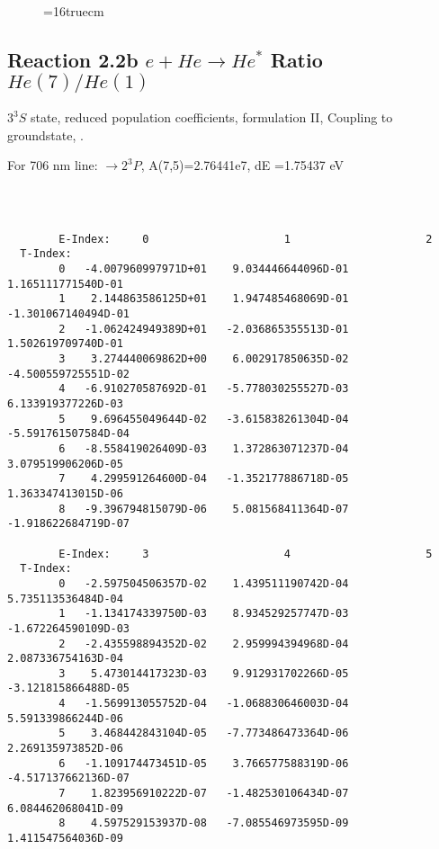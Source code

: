 \documentclass[12pt,dvipdfmx]{article}
\begin{document}
{\begin{small}
\begin{verbatim}
\end{verbatim}\end{small}
\begin{figure} \label{2.2a}
\epsfxsize=16truecm
\end{figure}
\newpage


\subsection{
  Reaction 2.2b $e + He \rightarrow He^*  $ Ratio $He(7)/He(1)$
}

  $3^3S$ state,
  reduced population coefficients, formulation II,
  Coupling to groundstate, \cite{kn:Fujimoto}.

  For 706 nm line: $\rightarrow 2^3P$, A(7,5)=2.76441e7, dE =1.75437 eV

\begin{small}\begin{verbatim}



        E-Index:     0                     1                     2
  T-Index:
        0   -4.007960997971D+01    9.034446644096D-01    1.165111771540D-01
        1    2.144863586125D+01    1.947485468069D-01   -1.301067140494D-01
        2   -1.062424949389D+01   -2.036865355513D-01    1.502619709740D-01
        3    3.274440069862D+00    6.002917850635D-02   -4.500559725551D-02
        4   -6.910270587692D-01   -5.778030255527D-03    6.133919377226D-03
        5    9.696455049644D-02   -3.615838261304D-04   -5.591761507584D-04
        6   -8.558419026409D-03    1.372863071237D-04    3.079519906206D-05
        7    4.299591264600D-04   -1.352177886718D-05    1.363347413015D-06
        8   -9.396794815079D-06    5.081568411364D-07   -1.918622684719D-07

        E-Index:     3                     4                     5
  T-Index:
        0   -2.597504506357D-02    1.439511190742D-04    5.735113536484D-04
        1   -1.134174339750D-03    8.934529257747D-03   -1.672264590109D-03
        2   -2.435598894352D-02    2.959994394968D-04    2.087336754163D-04
        3    5.473014417323D-03    9.912931702266D-05   -3.121815866488D-05
        4   -1.569913055752D-04   -1.068830646003D-04    5.591339866244D-06
        5    3.468442843104D-05   -7.773486473364D-06    2.269135973852D-06
        6   -1.109174473451D-05    3.766577588319D-06   -4.517137662136D-07
        7    1.823956910222D-07   -1.482530106434D-07    6.084462068041D-09
        8    4.597529153937D-08   -7.085546973595D-09    1.411547564036D-09


\end{verbatim}
\end{small}}
\end{document}
